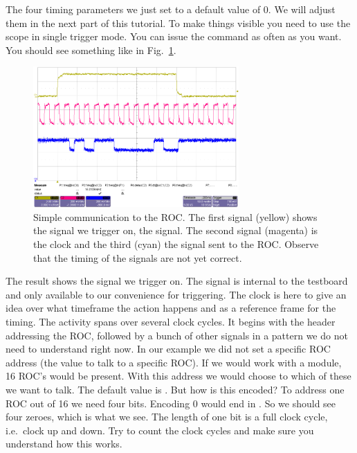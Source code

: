 \bigskip

The four timing parameters we just set to a default value of 0. We will adjust them in the next part of this tutorial.
To make things visible you need to use the scope in single trigger mode. You can issue the  command as often as you want. You should see something like in Fig.~\ref{fig:tut_scope2}.

\begin{figure}[h]
    \begin{center}
	\includegraphics[width=0.7\textwidth]{img/tut_scope2.png}
	\caption{Simple communication to the \gls{ROC}. The first signal (yellow) shows the signal we trigger on, the  signal. The second signal (magenta) is the clock and the third (cyan) the signal sent to the \gls{ROC}. Observe that the timing of the signals are not yet correct.}
	\label{fig:tut_scope2}
    \end{center}
\end{figure}

The result shows the signal we trigger on. The  signal is internal to the testboard and only available to our convenience for triggering. The clock is here to give an idea over what timeframe the action happens and as a reference frame for the timing. The activity spans over several clock cycles. It begins with the header addressing the \gls{ROC}, followed by a bunch of other signals in a pattern we do not need to understand right now. In our example we did not set a specific \gls{ROC} address (the value to talk to a specific \gls{ROC}). If we would work with a module, 16 \gls{ROC}'s would be present. With this address we would choose to which of these we want to talk. The default value is . But how is this encoded? To address one \gls{ROC} out of 16 we need four bits. Encoding 0 would end in . So we should see four zeroes, which is what we see. The length of one bit is a full clock cycle, i.e.~clock up and down. Try to count the clock cycles and make sure you understand how this works.

